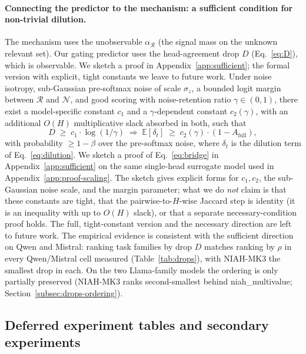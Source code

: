 \documentclass{article}
\begin{document}
\paragraph{Connecting the predictor to the mechanism: a sufficient
condition for non-trivial dilution.}
\label{subsec:conjecture}
The mechanism uses the unobservable $\alpha_{\mathcal{R}}$ (the signal
mass on the unknown relevant set). Our gating predictor uses the
head-agreement drop $D$ (Eq.~\eqref{eq:D}), which is observable. We
sketch a proof in Appendix~\ref{app:sufficient}; the formal version with
explicit, tight constants we leave to future work.
Under noise isotropy, sub-Gaussian pre-softmax noise of scale
$\sigma_z$, a bounded logit margin between $\mathcal{R}$ and
$\mathcal{N}$, and good scoring with noise-retention ratio $\gamma \in
(0, 1)$, there exist a model-specific constant $c_1$ and a
$\gamma$-dependent constant $c_2(\gamma)$, with an additional $O(H)$
multiplicative slack absorbed in both, such that
\begin{equation}
\label{eq:bridge}
D \;\ge\; c_1 \cdot \log(1/\gamma)
\;\Longrightarrow\;
\mathbb{E}[\delta_t] \;\ge\; c_2(\gamma) \cdot (1 - A_{\mathrm{full}}),
\end{equation}
with probability $\geq 1 - \beta$ over the pre-softmax noise, where
$\delta_t$ is the dilution term of Eq.~\eqref{eq:dilution}.
We sketch a proof of Eq.~\eqref{eq:bridge} in
Appendix~\ref{app:sufficient} on the same single-head surrogate model used
in Appendix~\ref{app:proof-scaling}. The sketch gives explicit forms for
$c_1, c_2$, the sub-Gaussian noise scale, and the margin parameter; what
we do \emph{not} claim is that these constants are tight, that the
pairwise-to-$H$-wise Jaccard step is identity (it is an inequality with
up to $O(H)$ slack), or that a separate necessary-condition proof holds.
The full, tight-constant version and the necessary direction are left to
future work. The empirical evidence is consistent with the sufficient
direction on Qwen and Mistral: ranking task families by drop $D$ matches
ranking by $\rho$ in every Qwen/Mistral cell measured
(Table~\ref{tab:drops}), with NIAH-MK3 the smallest drop in each. On the
two Llama-family models the ordering is only partially preserved
(NIAH-MK3 ranks second-smallest behind niah\_multivalue;
Section~\ref{subsec:drops-ordering}).

\subsection{Deferred experiment tables and secondary experiments}
\end{document}
